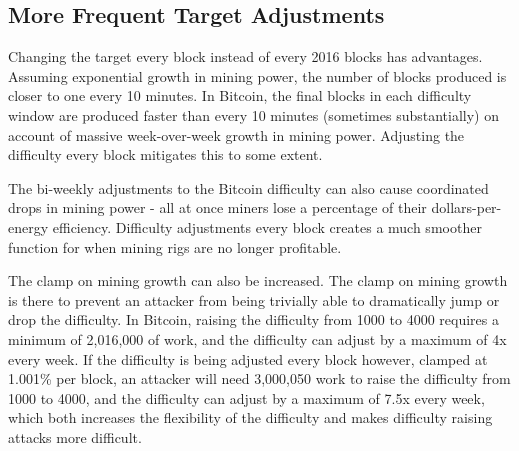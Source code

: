 \documentclass[twocolumn]{article}
\begin{document}


\subsection{More Frequent Target Adjustments}
Changing the target every block instead of every 2016 blocks has advantages.
Assuming exponential growth in mining power, the number of blocks produced is closer to one every 10 minutes.
In Bitcoin, the final blocks in each difficulty window are produced faster than every 10 minutes (sometimes substantially) on account of massive week-over-week growth in mining power.
Adjusting the difficulty every block mitigates this to some extent.

The bi-weekly adjustments to the Bitcoin difficulty can also cause coordinated drops in mining power - all at once miners lose a percentage of their dollars-per-energy efficiency.
Difficulty adjustments every block creates a much smoother function for when mining rigs are no longer profitable.

The clamp on mining growth can also be increased.
The clamp on mining growth is there to prevent an attacker from being trivially able to dramatically jump or drop the difficulty.
In Bitcoin, raising the difficulty from 1000 to 4000 requires a minimum of 2,016,000 of work, and the difficulty can adjust by a maximum of 4x every week.
If the difficulty is being adjusted every block however, clamped at 1.001\% per block, an attacker will need 3,000,050 work to raise the difficulty from 1000 to 4000, and the difficulty can adjust by a maximum of 7.5x every week, which both increases the flexibility of the difficulty and makes difficulty raising attacks more difficult.
\end{document}
